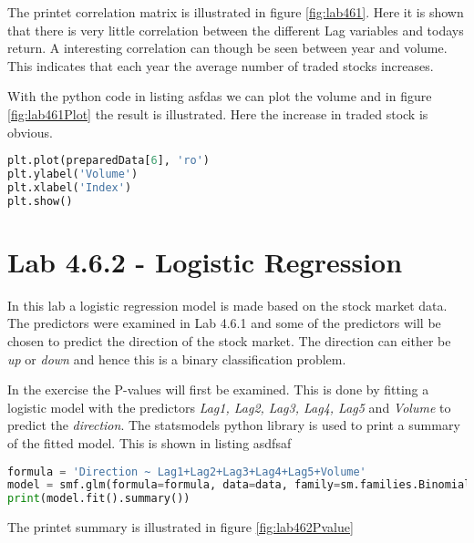 The printet correlation matrix is illustrated in figure \ref{fig:lab461}. Here it is shown that there is very little correlation between the different Lag variables and todays return. A interesting correlation can though be seen between year and volume. This indicates that each year the average number of traded stocks increases. 

\FloatBarrier

With the python code in listing asfdas we can plot the volume and in figure \ref{fig:lab461Plot} the result is illustrated. Here the increase in traded stock is obvious.
\begin{lstlisting}[language=Python, caption=print correlation matrix]
plt.plot(preparedData[6], 'ro')
plt.ylabel('Volume')
plt.xlabel('Index')
plt.show()
\end{lstlisting}


\section{Lab 4.6.2 - Logistic Regression}
In this lab a logistic regression model is made based on the stock market data. The predictors were examined in Lab 4.6.1 and some of the predictors will be chosen to predict the direction of the stock market. The direction can either be \emph{up} or \emph{down} and hence this is a binary classification problem.

In the exercise the P-values will first be examined. This is done by fitting a logistic model with the predictors \emph{Lag1, Lag2, Lag3, Lag4, Lag5} and \emph{Volume} to predict the \emph{direction}.  The statsmodels python library is used to print a summary of the fitted model. This is shown in listing asdfsaf
\begin{lstlisting}[language=Python, caption=print correlation matrix]
formula = 'Direction ~ Lag1+Lag2+Lag3+Lag4+Lag5+Volume'
model = smf.glm(formula=formula, data=data, family=sm.families.Binomial())
print(model.fit().summary())
\end{lstlisting}

The printet summary is illustrated in figure \ref{fig:lab462Pvalue}




